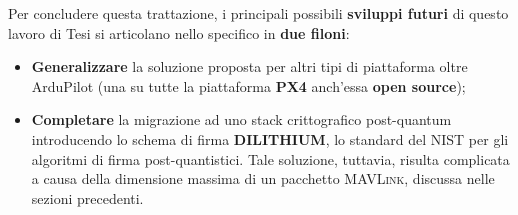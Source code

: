 \documentclass[a4paper, 12pt, oneside]{article}
\theoremstyle{definition}
\begin{document}
Per concludere questa trattazione, i principali possibili \textbf{sviluppi futuri} di questo lavoro di Tesi si articolano nello specifico in \textbf{due filoni}:

\begin{itemize}
    \item \textbf{Generalizzare} la soluzione proposta per altri tipi di piattaforma oltre ArduPilot (una su tutte la piattaforma \textbf{PX4} anch'essa \textbf{open source});
    \item \textbf{Completare} la migrazione ad uno stack crittografico post-quantum introducendo lo schema di firma \textbf{DILITHIUM}, lo standard del NIST per gli algoritmi di firma post-quantistici. Tale soluzione, tuttavia, risulta complicata a causa della dimensione massima di un pacchetto \textsc{MAVLink}, discussa nelle sezioni precedenti.
\end{itemize}

\newpage
\printbibliography[title={Riferimenti bibliografici e risorse consultate}, heading=bibintoc]
\end{document}
